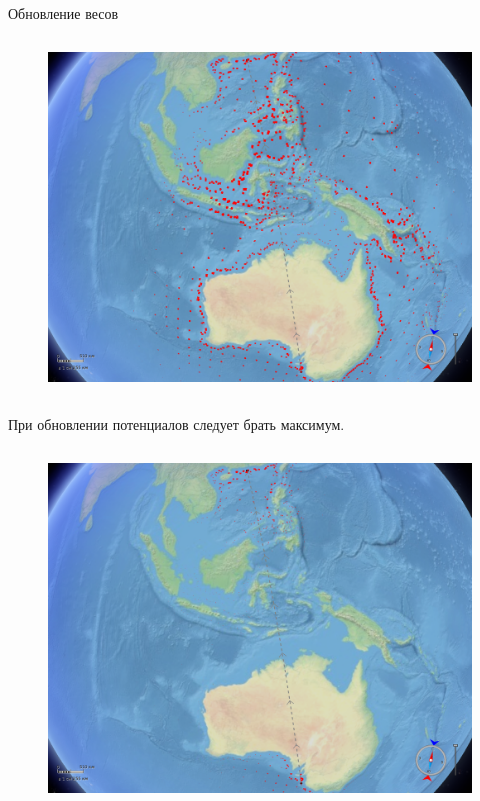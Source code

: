 \documentclass[russian, hyperref={unicode}]{beamer}
\begin{document}
\begin{frame}[noframenumbering]{Обновление весов}
{\begin{columns}
            \begin{figure}
                \includegraphics[clip=true, trim = 280pt 0 20pt 0, width=\textwidth]{Solution/potentials-update/max2}
            \end{figure}
        \end{columns}

        \begin{center}
            При обновлении потенциалов следует брать максимум.
        \end{center}
    }
   
     {
        \begin{columns}
            \begin{figure}
                \includegraphics[clip=true, trim = 280pt 0 20pt 0, width=\textwidth]{Solution/potentials-update/accum3}
            \end{figure}


\end{columns}}
\end{frame}
\end{document}
